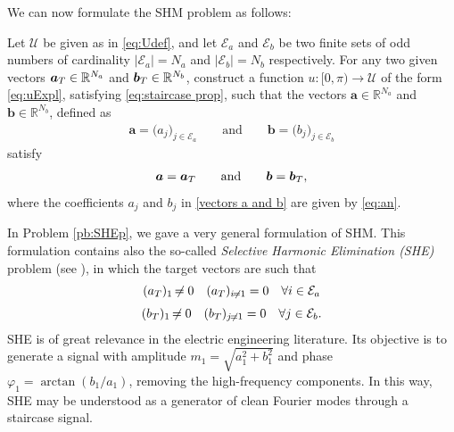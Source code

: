 \documentclass[twocolumn]{autart}    %
\begin{document}
We can now formulate the SHM problem as follows:

\bigskip

\begin{problem}[SHM]\label{pb:SHEp}
Let $\mathcal{U}$ be given as in \eqref{eq:Udef}, and let $\mathcal{E} _a $ and $\mathcal{E} _b $ be two finite sets of odd numbers of cardinality $|\mathcal{E}_a| = N_a $ and $ |\mathcal{E} _b| = N_b$ respectively. For any two given vectors $\aT \in \mathbb{R}^{N_a}$ and $\bT \in \mathbb{R}^{N_b} $, construct a function $u: [0,\pi)\to\mathcal{U}$ of the form \eqref{eq:uExpl}, satisfying \eqref{eq:staircase prop}, such that the vectors $\bm{a} \in \mathbb{R}^{N_a}$ and $\bm{b} \in \mathbb{R}^{N_b}$, defined as
\begin{align}\label{vectors a and b}
	\bm{a} = \big( a_j \big)_{j\in \mathcal{E}_a} \qquad \text{and} \qquad
	\bm{b} = \big( b_j \big)_{j\in \mathcal{E}_b}
\end{align}
satisfy
\begin{align*} 
	\bm{a} = \aT \qquad \text{and} \qquad \bm{b} = \bT,
\end{align*}
where the coefficients $a_j$ and $b_j$ in \eqref{vectors a and b} are given by \eqref{eq:an}.
\end{problem}  
\vspace{1em}

\begin{remark}[SHE]\label{remark:SHE}
In Problem \ref{pb:SHEp}, we gave a very general formulation of SHM. This formulation contains also the so-called \emph{Selective Harmonic Elimination (SHE)} problem (see \cite{Sun1996}), in which the target vectors are such that 
\begin{gather}
	\notag (a_T)_1 \neq 0  \hspace{1em} (a_T)_{i\neq1} = 0 \hspace{1em} \forall i \in \mathcal{E}_a 
	\\[3pt]
	\notag (b_T)_1 \neq 0  \hspace{1em} (b_T)_{j\neq1} = 0 \hspace{1em} \forall j \in \mathcal{E}_b. 
\end{gather}
SHE is of great relevance in the electric engineering literature. Its objective is to generate a signal with amplitude $m_1 = \sqrt{a_1^2+b_1^2}$ and phase $\varphi_1=\arctan(b_1/a_1)$, removing the high-frequency components. In this way, SHE may be understood as a generator of clean Fourier modes through a staircase signal.
\end{remark}
\end{document}
